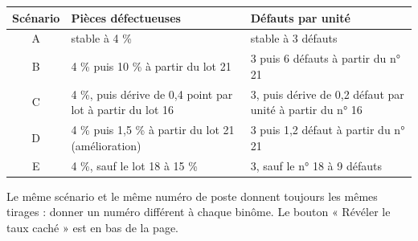 \documentclass[10pt,a4paper]{article}
\begin{document}
\renewcommand{\arraystretch}{1.2}
\begin{tabularx}{\linewidth}{@{}c X X@{}}
\toprule
\textbf{Scénario} & \textbf{Pièces défectueuses} & \textbf{Défauts par unité}\\\midrule
A & stable à 4 \% & stable à 3 défauts\\
B & 4 \% puis 10 \% à partir du lot 21 & 3 puis 6 défauts à partir du n° 21\\
C & 4 \%, puis dérive de 0,4 point par lot à partir du lot 16 & 3, puis dérive de 0,2 défaut par unité à partir du n° 16\\
D & 4 \% puis 1,5 \% à partir du lot 21 (amélioration) & 3 puis 1,2 défaut à partir du n° 21\\
E & 4 \%, sauf le lot 18 à 15 \% & 3, sauf le n° 18 à 9 défauts\\
\bottomrule
\end{tabularx}
{\small Le même scénario et le même numéro de poste donnent toujours les mêmes tirages : donner un numéro différent à chaque binôme. Le bouton « Révéler le taux caché » est en bas de la page.}
\end{document}
